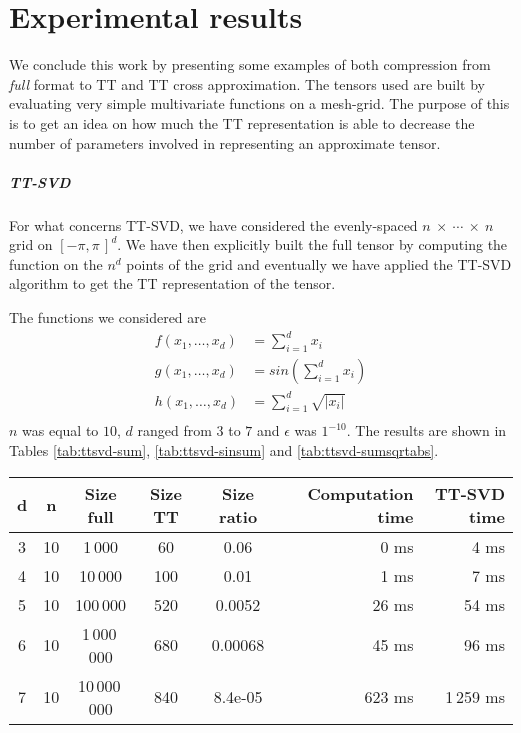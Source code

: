 \chapter{Experimental results}
We conclude this work by presenting some examples of both compression from \emph{full} format to TT and TT cross approximation. The tensors used are built by evaluating very simple multivariate functions on a mesh-grid. The purpose of this is to get an idea on how much the TT representation is able to decrease the number of parameters involved in representing an approximate tensor.

\paragraph{TT-SVD}
For what concerns TT-SVD, we have considered the evenly-spaced $n~\times~\cdots~\times~n$ grid on $[-\pi,\pi\,]^d$. We have then explicitly built the full tensor by computing the function on the $n^d$ points of the grid and eventually we have applied the TT-SVD algorithm to get the TT representation of the tensor.

The functions we considered are
\begin{align*}
  f(x_1,\ldots,x_d) &= \sum_{i=1}^{d} x_i\\
  g(x_1,\ldots,x_d) &= sin(\sum_{i=1}^{d} x_i)\\
  h(x_1,\ldots,x_d) &= \sum_{i=1}^{d} \sqrt{|x_i|}\\
\end{align*}
$n$ was equal to $10$, $d$ ranged from $3$ to $7$ and $\epsilon$ was $1^{-10}$.
The results are shown in Tables \ref{tab:ttsvd-sum}, \ref{tab:ttsvd-sinsum} and \ref{tab:ttsvd-sumsqrtabs}.

\begin{center}
  \begin{tabular}[t]{cccccrr}
    \toprule
    d & n  & Size full & Size TT & Size ratio & Computation time & TT-SVD time\\ \midrule
    3 & 10 & 1\,000     & 60     & 0.06      & 0 ms & 4 ms\\
    4 & 10 & 10\,000    & 100    & 0.01      & 1 ms & 7 ms\\
    5 & 10 & 100\,000   & 520    & 0.0052    & 26 ms & 54 ms\\
    6 & 10 & 1\,000\,000  & 680    & 0.00068   & 45 ms & 96 ms\\ 
    7 & 10 & 10\,000\,000 &840&8.4e-05& 623 ms & 1\,259 ms\\ \bottomrule
  \end{tabular}
\end{center}

